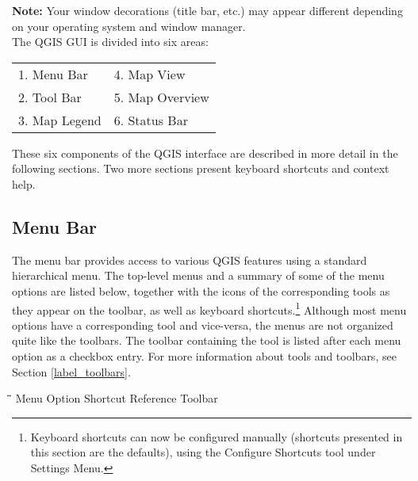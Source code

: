 \textbf{Note:} Your window decorations (title bar, etc.) may appear
different depending on your operating system and window manager.\\

The QGIS GUI is divided into six areas:

\begin{tabular}{p{5cm} p{5cm}}
1. Menu Bar & 4. Map View \\
2. Tool Bar & 5. Map Overview \\
3. Map Legend & 6. Status Bar \\
\end{tabular}

These six components of the QGIS interface are described in more detail in
the following sections. Two more sections present keyboard shortcuts and
context help.


\subsection{Menu Bar}\label{label_menubar}

The menu bar provides access to various QGIS features using a standard
hierarchical menu. The top-level menus and a summary of some of the
menu options are listed below, together with the icons of the corresponding
tools as they appear on the toolbar, as well as keyboard
shortcuts.\footnote{Keyboard shortcuts can now be configured manually
(shortcuts presented in this section are the defaults), using the Configure
Shortcuts tool under Settings Menu.}
Although most menu options have a corresponding tool and vice-versa,
the menus are not organized quite like the toolbars.
The toolbar containing the tool is listed after each menu option as a checkbox
entry. For more information about tools and toolbars, see Section
\ref{label_toolbars}.

\begin{tabbing}
\hspace{5.5cm}\=\hspace{3cm}\=\hspace{3.5cm}\= \kill
\hspace{1cm} Menu Option \> Shortcut \> Reference \> Toolbar\\
\end{tabbing}

